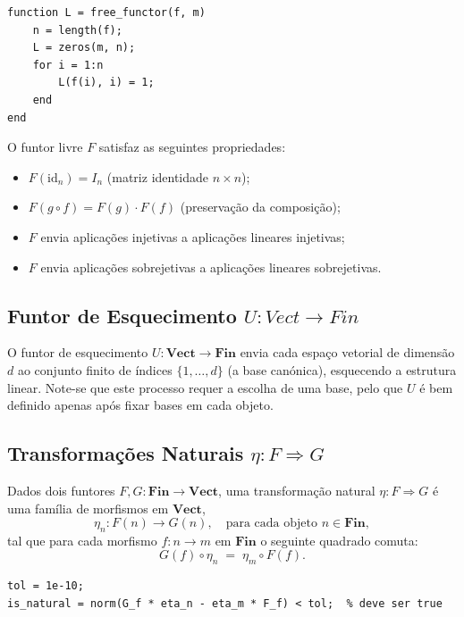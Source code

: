 \begin{lstlisting}[style=matlab, caption={Funtor livre $F$ aplicado a um morfismo}]
function L = free_functor(f, m)
    n = length(f);
    L = zeros(m, n);
    for i = 1:n
        L(f(i), i) = 1;
    end
end
\end{lstlisting}

\begin{proposition}
O funtor livre $F$ satisfaz as seguintes propriedades:
\begin{itemize}
    \item $F(\mathrm{id}_n) = I_n$ (matriz identidade $n \times n$);
    \item $F(g \circ f) = F(g) \cdot F(f)$ (preservação da composição);
    \item $F$ envia aplicações injetivas a aplicações lineares injetivas;
    \item $F$ envia aplicações sobrejetivas a aplicações lineares sobrejetivas.
\end{itemize}
\end{proposition}

\subsection{Funtor de Esquecimento \texorpdfstring{$U: Vect \to Fin$}{U: Vect -> Fin}}

O funtor de esquecimento $U: \mathbf{Vect} \to \mathbf{Fin}$ envia cada espaço vetorial de dimensão $d$ ao conjunto finito de índices $\{1,\ldots,d\}$ (a base canónica), esquecendo a estrutura linear. Note-se que este processo requer a escolha de uma base, pelo que $U$ é bem definido apenas após fixar bases em cada objeto.

\subsection{Transformações Naturais \texorpdfstring{$\eta: F \Rightarrow G$}{eta: F => G}}

Dados dois funtores $F, G: \mathbf{Fin} \to \mathbf{Vect}$, uma transformação natural $\eta: F \Rightarrow G$ é uma família de morfismos em $\mathbf{Vect}$,
\[
    \eta_n: F(n) \to G(n), \quad \text{para cada objeto } n \in \mathbf{Fin},
\]
tal que para cada morfismo $f: n \to m$ em $\mathbf{Fin}$ o seguinte quadrado comuta:
\[
    G(f) \circ \eta_n \;=\; \eta_m \circ F(f).
\]

\begin{lstlisting}[style=matlab, caption={Verificação da condição de naturalidade em $\mathbf{Vect}$}]
% G_f, F_f: matrizes de F(f) e G(f); eta_n, eta_m: componentes de eta
tol = 1e-10;
is_natural = norm(G_f * eta_n - eta_m * F_f) < tol;  % deve ser true
\end{lstlisting}

